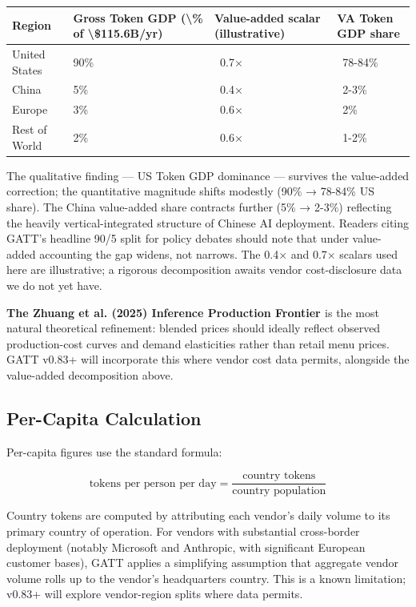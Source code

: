 \documentclass[11pt,a4paper]{article}
\begin{document}
\begin{center}
\begin{tabular}{llll}
\toprule
Region & Gross Token GDP (\textbackslash{}\% of \textbackslash{}\$115.6B/yr) & Value-added scalar (illustrative) & VA Token GDP share \\
\midrule
United States & 90\% & ~0.7× & ~78-84\% \\
China & 5\% & ~0.4× & ~2-3\% \\
Europe & 3\% & ~0.6× & ~2\% \\
Rest of World & 2\% & ~0.6× & ~1-2\% \\
\bottomrule
\end{tabular}
\end{center}


The qualitative finding --- US Token GDP dominance --- survives the value-added correction; the quantitative magnitude shifts modestly (90\% → 78-84\% US share). The China value-added share contracts further (5\% → 2-3\%) reflecting the heavily vertical-integrated structure of Chinese AI deployment. Readers citing GATT's headline 90/5 split for policy debates should note that under value-added accounting the gap widens, not narrows. The 0.4× and 0.7× scalars used here are illustrative; a rigorous decomposition awaits vendor cost-disclosure data we do not yet have.

\textbf{The Zhuang et al. (2025) Inference Production Frontier \cite{zhuang2025beyond}} is the most natural theoretical refinement: blended prices should ideally reflect observed production-cost curves and demand elasticities rather than retail menu prices. GATT v0.83+ will incorporate this where vendor cost data permits, alongside the value-added decomposition above.

\subsection{Per-Capita Calculation}

Per-capita figures use the standard formula:

\begin{equation*}
 \text{tokens per person per day} = \frac{\text{country tokens}}{\text{country population}} 
\end{equation*}

Country tokens are computed by attributing each vendor's daily volume to its primary country of operation. For vendors with substantial cross-border deployment (notably Microsoft and Anthropic, with significant European customer bases), GATT applies a simplifying assumption that aggregate vendor volume rolls up to the vendor's headquarters country. This is a known limitation; v0.83+ will explore vendor-region splits where data permits.
\end{document}
